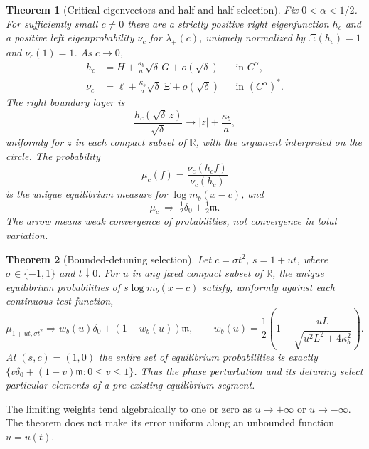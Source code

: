 \documentclass[11pt,a4paper]{article}
\numberwithin{equation}{section}
\newtheorem{theorem}{Theorem}[section]
\theoremstyle{definition}
\theoremstyle{remark}
\newcommand{\RR}{\mathbb R}
\newcommand{\Leb}{\mathfrak m}
\begin{document}
\begin{theorem}[Critical eigenvectors and half-and-half selection]
\label{thm:selection-critical}
Fix $0<\alpha<1/2$. For sufficiently small $c\ne0$ there are a strictly
positive right eigenfunction $h_c$ and a positive left eigenprobability
$\nu_c$ for $\lambda_+(c)$, uniquely normalized by
$\Xi(h_c)=1$ and $\nu_c(1)=1$. As $c\to0$,
\begin{align}
 h_c&=H+\frac{\kappa_b}{a}\sqrt\delta\,G+o(\sqrt\delta)
 &&\text{in }C^\alpha,\label{eq:right-expansion}\\
 \nu_c&=\ell+\frac{\kappa_b}{a}\sqrt\delta\,\Xi+o(\sqrt\delta)
 &&\text{in }(C^\alpha)^*.\label{eq:left-expansion}
\end{align}
The right boundary layer is
\begin{equation}
 \frac{h_c(\sqrt\delta\,z)}{\sqrt\delta}
 \longrightarrow |z|+\frac{\kappa_b}{a},
 \label{eq:boundary-critical}
\end{equation}
uniformly for $z$ in each compact subset of $\RR$, with the argument
interpreted on the circle. The probability
\begin{equation}
 \mu_c(f)=\frac{\nu_c(h_cf)}{\nu_c(h_c)}
 \label{eq:mu}
\end{equation}
is the unique equilibrium measure for $\log m_b(x-c)$, and
\begin{equation}
 \boxed{\displaystyle\mu_c\ \Longrightarrow\
             \tfrac12\delta_0+\tfrac12\Leb.}
 \label{eq:half-selection}
\end{equation}
The arrow means weak convergence of probabilities, not convergence in
total variation.
\end{theorem}

\begin{theorem}[Bounded-detuning selection]
\label{thm:selection-detuned}
Let $c=\sigma t^2$, $s=1+ut$, where $\sigma\in\{-1,1\}$ and $t\downarrow0$.
For $u$ in any fixed compact subset of $\RR$, the unique equilibrium
probabilities of $s\log m_b(x-c)$ satisfy, uniformly against each
continuous test function,
\begin{equation}
 \boxed{\displaystyle
 \mu_{1+ut,\sigma t^2}\Longrightarrow
 w_b(u)\delta_0+(1-w_b(u))\Leb,\qquad
 w_b(u)=\frac12\left(1+
 \frac{uL}{\sqrt{u^2L^2+4\kappa_b^2}}\right).}
 \label{eq:detuned-selection}
\end{equation}
At $(s,c)=(1,0)$ the entire set of equilibrium probabilities is exactly
$\{v\delta_0+(1-v)\Leb:0\le v\le1\}$. Thus the phase perturbation and its
detuning select particular elements of a pre-existing equilibrium segment.
\end{theorem}
The limiting weights tend algebraically to one or zero as
$u\to+\infty$ or $u\to-\infty$. The theorem does not make its error
uniform along an unbounded function $u=u(t)$.
\end{document}

